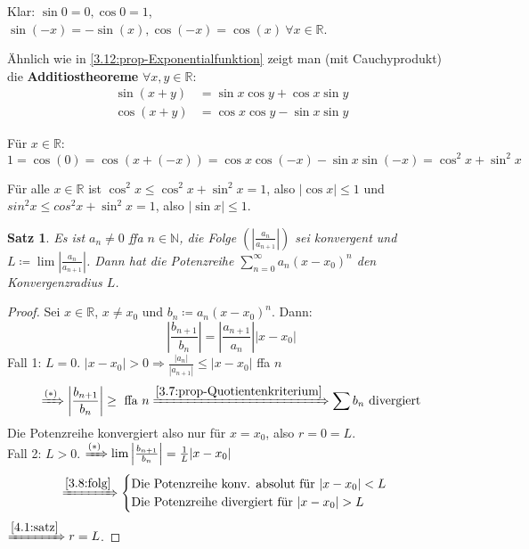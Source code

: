 \documentclass[14pt,titlepage,ngerman,a4paper,headsepline,DIV15,halfparskip*]{scrartcl}
\newcommand{\N}{\mathbb{N}}
\newcommand{\R}{\mathbb{R}}
\theoremstyle{named}
\theoremstyle{dotless}
\newtheorem{satz}[namedtheorem]{Satz}
\begin{document}
Klar: $\sin 0 = 0, \cos 0 = 1$, $\sin (-x) = - \sin(x), \cos(-x) = \cos(x) ~\forall x \in \R$.

Ähnlich wie in \ref{3.12:prop-Exponentialfunktion} zeigt man (mit Cauchyprodukt) die \textbf{Additiostheoreme} $\forall x,y \in \R$:
\begin{align*}
	\sin(x+y) & = \sin x \cos y + \cos x \sin y \\
	\cos(x+y) & = \cos x \cos y - \sin x \sin y
\end{align*}

Für $x \in \R$:
	$$ 1 = \cos(0) = \cos( x + (-x) )= \cos x \cos(-x) - \sin x \sin(-x) = \cos^{2} x + \sin^{2} x $$

Für alle $x \in \R$ ist $\cos^{2} x \leq \cos^{2} x + \sin^{2} x = 1$, also $|\cos x | \leq 1$ und $sin^{2} x \leq cos^{2} x + \sin^{2} x = 1$, also $|\sin x | \leq 1$.


\begin{satz} \label{4.4:satz}
	Es ist $a_{n} \neq 0$ ffa $n \in \N$, die Folge $\left( \left| \frac{a_{n}}{a_{n+1}} \right| \right)$ sei konvergent und $L \coloneqq \lim \left| \frac{a_{n}}{a_{n+1}} \right|$. Dann hat die Potenzreihe $\sum_{n=0}^{\infty} a_{n} (x - x_{0})^{n}$ den Konvergenzradius $L$.
\end{satz}

\begin{proof}
	Sei $x \in \R$, $x \neq x_{0}$ und $b_{n} \coloneqq a_{n} (x - x_{0})^{n}$. Dann:
	\[ \left| \frac{b_{n+1}}{b_{n}} \right| = \left| \frac{a_{n+1}}{a_{n}} \right| |x - x_{0}| \tag*{$(*)$} \]
	Fall 1: $L = 0$. $|x - x_{0}| > 0 \Rightarrow \frac{|a_{n}|}{|a_{n+1}|} \leq | x - x_{0}|$ ffa $n$
	$$ \xRightarrow[]{(*)} \left| \frac{b_{n+1}}{b_{n}} \right| \geq \text{ ffa } n \xRightarrow[]{\ref{3.7:prop-Quotientenkriterium}} \sum b_{n} \text{ divergiert} $$
	Die Potenzreihe konvergiert also nur für $x = x_{0}$, also $r = 0 = L$. \\
	Fall 2: $L > 0$. $\xRightarrow[]{(*)} \lim \left| \frac{b_{n+1}}{b_{n}} \right| = \frac{1}{L} |x - x_{0}|$
	$$ \xRightarrow[]{\ref{3.8:folg}} \begin{cases}
		\text{Die Potenzreihe konv. absolut für } |x - x_{0}| < L \\
		\text{Die Potenzreihe divergiert für } |x - x_{0}| > L
	\end{cases} $$
	$\xRightarrow[]{\ref{4.1:satz}} r = L$.
\end{proof}


\newpage
\end{document}
